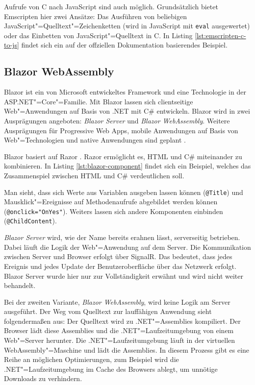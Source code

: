 Aufrufe von C nach JavaScript sind auch möglich. Grundsätzlich bietet Emscripten hier zwei Ansätze: Das Ausführen von beliebigen JavaScript"=Quelltext"=Zeichenketten (wird in JavaScript mit \lstinline{eval} ausgewertet) oder das Einbetten von JavaScript"=Quelltext in C. In Listing \ref{lst:emscripten-c-to-js} findet sich ein auf der offziellen Dokumentation basierendes Beispiel.



\subsection{Blazor WebAssembly}
Blazor \cite{Blazor} ist ein von Microsoft entwickeltes Framework und eine Technologie in der ASP.NET"=Core"=Familie. Mit Blazor lassen sich clientseitige Web"=Anwendungen auf Basis von .NET mit C\#{} entwickeln. Blazor wird in zwei Ausprägungen angeboten: \emph{Blazor Server} und \emph{Blazor WebAssembly}. Weitere Ausprägungen für Progressive Web Apps, mobile Anwendungen auf Basis von Web"=Technologien und native Anwendungen sind geplant \cite{BlazorBlog}.

Blazor basiert auf Razor \cite{Razor}. Razor ermöglicht es, HTML und C\#{} miteinander zu kombinieren. In Listing \ref{lst:blazor-component} findet sich ein Beispiel, welches das Zusammenspiel zwischen HTML und C\#{} verdeutlichen soll.

\pagebreak


Man sieht, dass sich Werte aus Variablen ausgeben lassen können (\lstinline{@Title}) und Mausklick"=Ereignisse auf Methodenaufrufe abgebildet werden können (\lstinline{@onclick="OnYes"}). Weiters lassen sich andere Komponenten einbinden (\lstinline{@ChildContent}).

\emph{Blazor Server} wird, wie der Name bereits erahnen lässt, serverseitig betrieben. Dabei läuft die Logik der Web"=Anwendung auf dem Server. Die Kommunikation zwischen Server und Browser erfolgt über SignalR. Das bedeutet, dass jedes Ereignis und jedes Update der Benutzeroberfläche über das Netzwerk erfolgt. Blazor Server wurde hier nur zur Vollständigkeit erwähnt und wird nicht weiter behandelt.

Bei der zweiten Variante, \emph{Blazor WebAssembly}, wird keine Logik am Server ausgeführt. Der Weg vom Quelltext zur lauffähigen Anwendung sieht folgendermaßen aus: Der Quelltext wird zu .NET"=Assemblies kompiliert. Der Browser lädt diese Assemblies und die .NET"=Laufzeitumgebung von einem Web"=Server herunter. Die .NET"=Laufzeitumgebung läuft in der virtuellen WebAssembly"=Maschine und lädt die Assemblies. In diesem Prozess gibt es eine Reihe an möglichen Optimierungen, zum Beispiel wird die .NET"=Laufzeitumgebung im Cache des Browsers ablegt, um unnötige Downloads zu verhindern.

